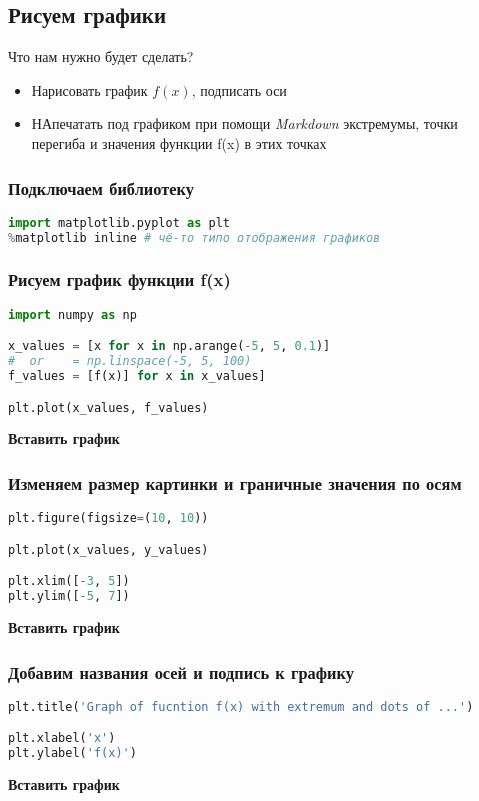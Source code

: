 \documentclass{article}
\theoremstyle{problemstyle}
\theoremstyle{ans}
\begin{document}
\subsection{Рисуем графики}
Что нам нужно будет сделать?
\begin{itemize}
    \item Нарисовать график $f(x)$, подписать оси
    \item НАпечатать под графиком при помощи \textit{Markdown} экстремумы, точки перегиба и значения функции f(x) в этих точках
\end{itemize}
\subsubsection{Подключаем библиотеку}
\begin{lstlisting}[language=python]
import matplotlib.pyplot as plt
%matplotlib inline # чё-то типо отображения графиков
\end{lstlisting}

\subsubsection{Рисуем график функции f(x)}
\begin{lstlisting}[language=python]
import numpy as np

x_values = [x for x in np.arange(-5, 5, 0.1)]
#  or    = np.linspace(-5, 5, 100)
f_values = [f(x)] for x in x_values]

plt.plot(x_values, f_values)
\end{lstlisting}
\textbf{Вставить график}

\subsubsection{Изменяем размер картинки и граничные значения по осям}
\begin{lstlisting}[language=python]
plt.figure(figsize=(10, 10))

plt.plot(x_values, y_values)

plt.xlim([-3, 5])
plt.ylim([-5, 7])
\end{lstlisting}
\textbf{Вставить график}

\subsubsection{Добавим названия осей и подпись к графику}
\begin{lstlisting}[language=python]
plt.title('Graph of fucntion f(x) with extremum and dots of ...')

plt.xlabel('x')
plt.ylabel('f(x)')
\end{lstlisting}
\textbf{Вставить график}
\end{document}
